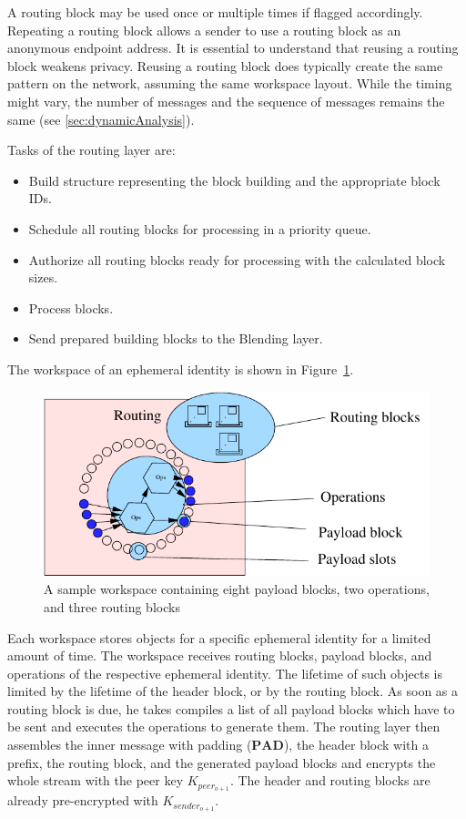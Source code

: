\documentclass[acmsmall, screen, review]{acmart}
\begin{document}
	A routing block may be used once or multiple times if flagged accordingly. Repeating a routing block allows a sender to use a routing block as an anonymous endpoint address. It is essential to understand that reusing a routing block weakens privacy. Reusing a routing block does typically create the same pattern on the network, assuming the same workspace layout. While the timing might vary, the number of messages and the sequence of messages remains the same (see \ref{sec:dynamicAnalysis}).
	
	Tasks of the routing layer are:
	\begin{itemize}
		\item Build structure representing the block building and the appropriate block IDs.
		\item Schedule all routing blocks for processing in a priority queue.
		\item Authorize all routing blocks ready for processing with the calculated block sizes.
		\item Process blocks.
		\item Send prepared building blocks to the Blending layer.
	\end{itemize}
	
	The workspace of an ephemeral identity is shown in Figure~\ref{fig:workspace}.
	
	\begin{figure}[ht]
		\centering\includegraphics[width=0.6\columnwidth]{roughProtocolDesign_workspace}
		\caption{A sample workspace containing eight payload blocks, two operations, and three routing blocks}
		\label{fig:workspace}
	\end{figure}
	
	Each workspace stores objects for a specific ephemeral identity for a limited amount of time. The workspace receives routing blocks, payload blocks, and operations of the respective ephemeral identity. The lifetime of such objects is limited by the lifetime of the header block, or by the routing block. As soon as a routing block is due, he takes compiles a list of all payload blocks which have to be sent and executes the operations to generate them. The routing layer then assembles the inner message with padding ($\mathbf{PAD}$), the header block with a prefix, the routing block, and the generated payload blocks and encrypts the whole stream with the peer key $K_{peer_{o+1}}$. The header and routing blocks are already pre-encrypted with $K_{sender_{o+1}}$.
	
\end{document}
